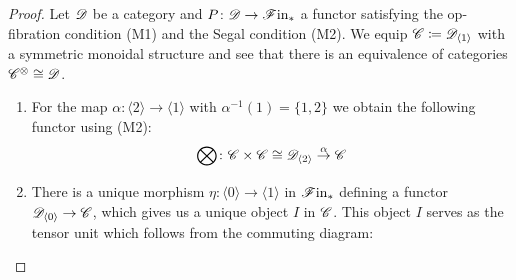  \begin{proof}
    Let $\mathscr{D}$ be a category and $P \colon \mathscr{D} \to \mathscr{F} \text{in}_{\ast}$ a functor satisfying the
    op-fibration condition (M1) and the Segal condition (M2). We equip $\mathscr{C}
    \coloneqq \mathscr{D}_{\langle 1 \rangle}$ with a symmetric monoidal structure and
    see that there is an equivalence of categories $\mathscr{C}^{\otimes} \cong \mathscr{D}$.
    \begin{enumerate}
    \item For the map $\alpha \colon \langle 2 \rangle \to \langle 1 \rangle$
    with $\alpha^{-1}(1) = \{1,2\}$ we obtain the following functor using (M2):
        \[
            \bigotimes \colon \mathscr{C} \times \mathscr{C} \cong \mathscr{D}_{\langle 2 \rangle} \overset{\alpha}\rightarrow \mathscr{C}
        \]
        
    \item There is a unique morphism $\eta \colon \langle 0 \rangle \to \langle
    1 \rangle$ in $\mathscr{F} \text{in}_{\ast}$ defining a functor $\mathscr{D}_{\langle 0 \rangle} \to \mathscr{C}$,
    which gives us a unique object $I$ in $\mathscr{C}$. This object $I$ serves as
    the tensor unit which follows from the commuting diagram:
    \begin{center}
     \end{center}


\end{enumerate}
\end{proof}
